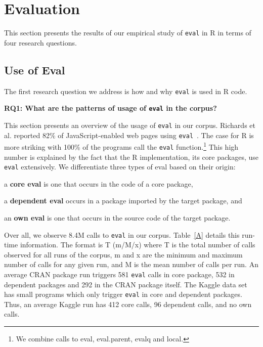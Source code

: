 \documentclass[USenglish,cleveref, autoref, thm-restate]{lipics-v2019}
\newcommand{\AllAllCallCountRnd}{8.4M\xspace}
\newcommand{\eval}{\texttt{eval}\xspace}
\begin{document}
\section{Evaluation}

This section presents the results of our empirical study of \eval in R in terms
of four research questions.

\subsection{Use of Eval}

The first research question we address is how and why \eval is used in R code.

\begin{center}{\bfseries RQ1: What are the patterns of usage of \eval in the corpus?}\end{center}

This section presents an overview of the usage of \eval in our corpus. Richards
et al. reported 82\% of JavaScript-enabled web pages using \eval~\cite{ecoop11}.
The case for R is more striking with 100\% of the programs call the \eval
function.\footnote{We combine calls to {\sf eval}, {\sf eval.parent}, {\sf
    evalq} and {\sf local}.} This high number is explained by the fact that the
R implementation, its core packages, use \eval extensively. We differentiate
three types of eval based on their origin:
%
\begin{compactitem}[$-$]
  \item a {\bf core eval} is one that occurs in the code of a core package,
  \item a {\bf dependent eval} occurs in a package imported by the target
  package, and
  \item an {\bf own eval} is one that occurs in the source code of the target
  package.
\end{compactitem}

Over all, we observe \AllAllCallCountRnd calls to \eval in our corpus.
Table~\ref{A} details this run-time information. The format is T (m/M/x)
where T is the total number of calls observed for all runs of the corpus, m
and x are the minimum and maximum number of calls for any given run, and M
is the mean number of calls per run. An average CRAN package run triggers
581 {\eval} calls in core package, 532 in dependent packages and 292 in the
CRAN package itself.  The Kaggle data set has small programs which only
trigger \eval in core and dependent packages. Thus, an average Kaggle run
has 412 core calls, 96 dependent calls, and no own calls.
\end{document}

